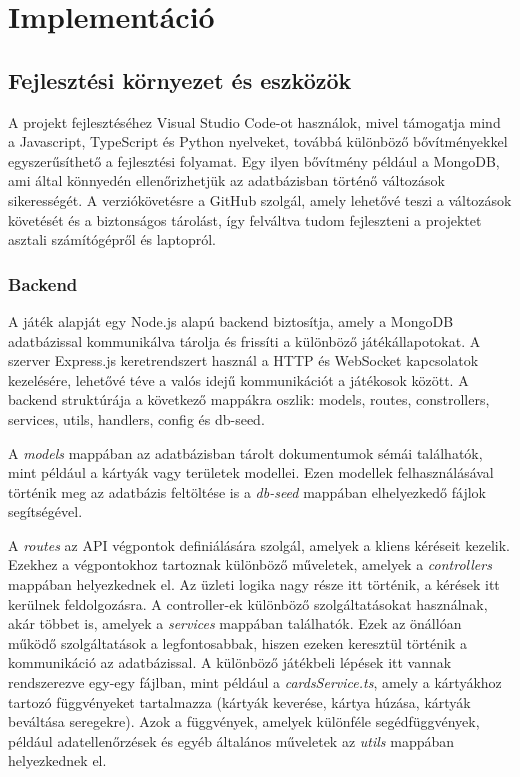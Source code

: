 \documentclass[
]{thesis-ekf}
\theoremstyle{definition}
\theoremstyle{remark}
\begin{document}
	\chapter{Implementáció}
	
	\section{Fejlesztési környezet és eszközök}
	
	A projekt fejlesztéséhez Visual Studio Code-ot használok, mivel támogatja mind a Javascript, TypeScript és Python nyelveket, továbbá különböző bővítményekkel egyszerűsíthető a fejlesztési folyamat. Egy ilyen bővítmény például a MongoDB, ami által könnyedén ellenőrizhetjük az adatbázisban történő változások sikerességét. A verziókövetésre a GitHub szolgál, amely lehetővé teszi a változások követését és a biztonságos tárolást, így felváltva tudom fejleszteni a projektet asztali számítógépről és laptopról.
	
	\subsection{Backend}
	
	A játék alapját egy Node.js alapú backend biztosítja, amely a MongoDB adatbázissal kommunikálva tárolja és frissíti a különböző játékállapotokat. A szerver Express.js keretrendszert használ a HTTP és WebSocket kapcsolatok kezelésére, lehetővé téve a valós idejű kommunikációt a játékosok között. A backend struktúrája a következő mappákra oszlik: models, routes, constrollers, services, utils, handlers, config és db-seed. 
	
	A \emph{models} mappában az adatbázisban tárolt dokumentumok sémái találhatók, mint például a kártyák vagy területek modellei. Ezen modellek felhasználásával történik meg az adatbázis feltöltése is a \emph{db-seed} mappában elhelyezkedő fájlok segítségével. 
	
	A \emph{routes} az API végpontok definiálására szolgál, amelyek a kliens kéréseit kezelik. Ezekhez a végpontokhoz tartoznak különböző műveletek, amelyek a \emph{controllers} mappában helyezkednek el. Az üzleti logika nagy része itt történik, a kérések itt kerülnek feldolgozásra. A controller-ek különböző szolgáltatásokat használnak, akár többet is, amelyek a \emph{services} mappában találhatók. Ezek az önállóan működő szolgáltatások a legfontosabbak, hiszen ezeken keresztül történik a kommunikáció az adatbázissal. A különböző játékbeli lépések itt vannak rendszerezve egy-egy fájlban, mint például a \emph{cardsService.ts}, amely a kártyákhoz tartozó függvényeket tartalmazza (kártyák keverése, kártya húzása, kártyák beváltása seregekre). Azok a függvények, amelyek különféle segédfüggvények, például adatellenőrzések és egyéb általános műveletek az \emph{utils} mappában helyezkednek el.
	
\end{document}
